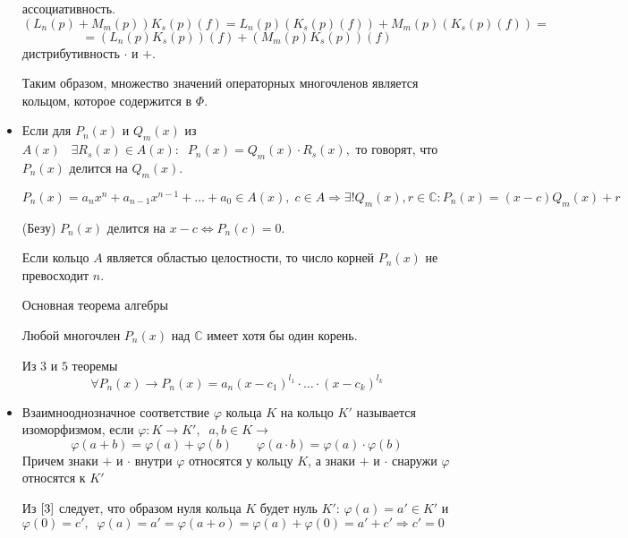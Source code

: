 \begin{itemize}
    ассоциативность. $$(L_n(p)+M_m(p))K_s(p)(f)=L_n(p)(K_s(p)(f))+M_m(p)(K_s(p)(f))= $$ 
    $$ = (L_n(p)K_s(p))(f)+(M_m(p)K_s(p))(f)$$дистрибутивность $\cdot $ и $+$.\par
    Таким образом, множество значений операторных многочленов является кольцом, которое содержится в $\varPhi$.
    \item Если для $P_n(x)$ и $Q_m(x)$ из $A(x)\;\;\;\exists R_s(x)\in A(x): \;\;P_n(x)=Q_m(x)\cdot R_s(x), $ то говорят, что $P_n(x)$ делится на $Q_m(x)$.
    \begin{theorem}
    $$P_n(x) = a_n x^n + a_{n-1} x^{n-1} + \dots + a_0 \in A(x), \;c \in A \Rightarrow \exists ! Q_m(x),  r\in \mathds{C}:P_n(x)=(x-c)Q_m(x)+r$$
    \end{theorem}
    \begin{theorem}
    (Безу) $P_n(x)$ делится на $x-c\Leftrightarrow P_n(c)=0$.
    \end{theorem}
    \begin{theorem}
    Если кольцо $A$ является областью целостности, то число корней $P_n(x)$ не превосходит $n$.
    \end{theorem}
    \begin{theorem}
    Основная теорема алгебры \par
    Любой многочлен $P_n(x)$ над $\mathds{C}$ имеет хотя бы один корень.
    \end{theorem}
    \begin{proposition}
    Из $3$ и $5$ теоремы \begin{equation}
        \forall P_n(x)\rightarrow P_n(x)=a_n(x-c_1)^{l_1}\cdot \dots
    \cdot (x-c_k)^{l_k} 
    \end{equation}
    \end{proposition}
    \item Взаимнооднозначное соответствие $\varphi$ кольца $K$ на кольцо $K'$ называется изоморфизмом, если $\varphi : K \rightarrow K',\;\;a,b\in K \rightarrow$
    \begin{equation}
        \label{3}
        \varphi(a+b)=\varphi(a)+\varphi(b)\;\;\;\;\;\;\;\varphi(a\cdot b)=\varphi(a)\cdot\varphi(b)
    \end{equation}
    Причем знаки $+$ и $\cdot$ внутри $\varphi$ относятся у кольцу $K$, а знаки $+$ и $\cdot$ снаружи $\varphi$ относятся к $K'$\par
    Из $\eqref{3}$ следует, что образом нуля кольца $K$ будет нуль $K'$: $\varphi(a)=a'\in K'$ и $\varphi(0)=c',\;\;\varphi(a)=a'=\varphi(a+o) = \varphi(a)+\varphi(0)=a'+c'\Rightarrow c'=0$\par

\end{itemize}
